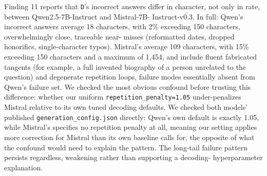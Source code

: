 \documentclass[11pt]{article}
\begin{document}
Finding 11 reports that \texttt{D}'s incorrect answers differ in
character, not only in rate, between Qwen2.5-7B-Instruct and Mistral-7B-
Instruct-v0.3. In full: Qwen's incorrect answers average 18 characters,
with 2\% exceeding 150 characters, overwhelmingly close, traceable near-
misses (reformatted dates, dropped honorifics, single-character typos).
Mistral's average 109 characters, with 15\% exceeding 150 characters and
a maximum of 1,454, and include fluent fabricated tangents (for example,
a full invented biography of a person unrelated to the question) and
degenerate repetition loops, failure modes essentially absent from
Qwen's failure set. We checked the most obvious confound before trusting
this difference: whether our uniform \texttt{repetition\_penalty=1.05}
under-penalizes Mistral relative to its own tuned decoding defaults. We
checked both models' published \texttt{generation\_config.json} directly:
Qwen's own default is exactly 1.05, while Mistral's specifies no
repetition penalty at all, meaning our setting applies more correction
for Mistral than its own baseline calls for, the opposite of what the
confound would need to explain the pattern. The long-tail failure pattern
persists regardless, weakening rather than supporting a decoding-
hyperparameter explanation.
\end{document}
